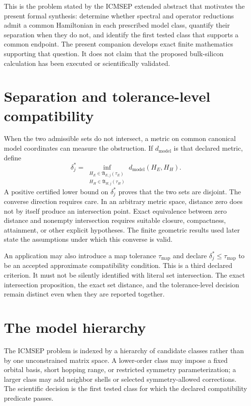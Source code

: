 This is the problem stated by the ICMSEP extended abstract that motivates the present
formal synthesis: determine whether spectral and operator reductions admit a common
Hamiltonian in each prescribed model class, quantify their separation when they do not,
and identify the first tested class that supports a common endpoint.  The present
companion develops exact finite mathematics supporting that question.  It does not
claim that the proposed bulk-silicon calculation has been executed or scientifically
validated.

\section{Separation and tolerance-level compatibility}

When the two admissible sets do not intersect, a metric on common canonical model
coordinates can measure the obstruction.  If $d_{\mathrm{model}}$ is that declared
metric, define
\[
  \delta_j^*
  =\inf_{\substack{
       H_E\in\mathfrak A_{E,j}(\tau_E)\\
       H_H\in\mathfrak A_{H,j}(\tau_H)}}
    d_{\mathrm{model}}(H_E,H_H).
\]
A positive certified lower bound on $\delta_j^*$ proves that the two sets are disjoint.
The converse direction requires care.  In an arbitrary metric space, distance zero does
not by itself produce an intersection point.  Exact equivalence between zero distance
and nonempty intersection requires suitable closure, compactness, attainment, or other
explicit hypotheses.  The finite geometric results used later state the assumptions
under which this converse is valid.

An application may also introduce a map tolerance $\tau_{\mathrm{map}}$ and declare
$\delta_j^*\leq\tau_{\mathrm{map}}$ to be an accepted approximate compatibility
condition.  This is a third declared criterion.  It must not be silently identified
with literal set intersection.  The exact intersection proposition, the exact set
distance, and the tolerance-level decision remain distinct even when they are reported
together.

\section{The model hierarchy}

The ICMSEP problem is indexed by a hierarchy of candidate classes rather than by one
unconstrained matrix space.  A lower-order class may impose a fixed orbital basis,
short hopping range, or restricted symmetry parameterization; a larger class may add
neighbor shells or selected symmetry-allowed corrections.  The scientific decision is
the first tested class for which the declared compatibility predicate passes.

